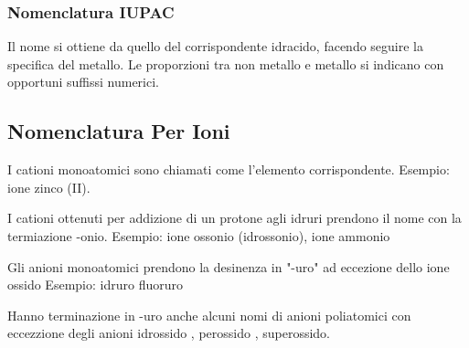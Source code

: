 \documentclass[a4paper]{article}
\begin{document}
\subsubsection{Nomenclatura IUPAC}
Il nome si ottiene da quello del corrispondente idracido, facendo seguire la specifica del metallo. Le proporzioni tra non metallo e metallo si indicano con opportuni suffissi numerici. 

\subsection{Nomenclatura Per Ioni}
I cationi monoatomici sono chiamati come l'elemento corrispondente. Esempio:  ione zinco (II). 

I cationi ottenuti per addizione di un protone agli idruri prendono il nome con la termiazione -onio. Esempio:  ione ossonio (idrossonio),  ione ammonio

Gli anioni monoatomici prendono la desinenza in "-uro" ad eccezione dello ione ossido  Esempio:  idruro  fluoruro

Hanno terminazione in -uro anche alcuni nomi di anioni poliatomici con eccezzione degli anioni idrossido , perossido , superossido. 
\end{document}
